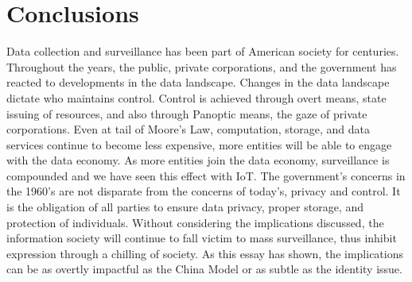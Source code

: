 \section{Conclusions}
Data collection and surveillance has been part of American society for
centuries. Throughout the years, the public, private corporations, and the
government has reacted to developments in the data landscape. Changes in the
data landscape dictate who maintains control. Control is achieved through overt
means, state issuing of resources, and also through Panoptic means, the gaze of
private corporations. Even at tail of Moore's Law, computation, storage, and
data services continue to become less expensive, more entities will be able to
engage with the data economy. As more entities join the data economy,
surveillance is compounded and we have seen this effect with IoT. The
government's concerns in the 1960's are not disparate from the concerns of
today's, privacy and control. It is the obligation of all parties to ensure data
privacy, proper storage, and protection of individuals. Without considering the
implications discussed, the information society will continue to fall victim to
mass surveillance, thus inhibit expression through a chilling of society. As
this essay has shown, the implications can be as overtly impactful as the China
Model or as subtle as the identity issue.
